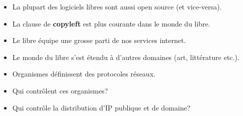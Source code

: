 \begin{slide}
	\begin{itemize}
		\item La plupart des logiciels libres sont aussi open source (et vice-versa).
		\item La clause de \textbf{copyleft} est plus courante dans le monde du libre.
		\item Le libre équipe une grosse parti de nos services internet.
		\item Le monde du libre s'est étendu à d'autres domaines (art, littérature etc.).
	\end{itemize}
\end{slide}

\begin{slide}
	\begin{itemize}
		\item Organismes définissent des protocoles réseaux.
		\item Qui contrôlent ces organismes?
		\item Qui contrôle la distribution d'IP publique et de domaine?
	\end{itemize}
\end{slide}